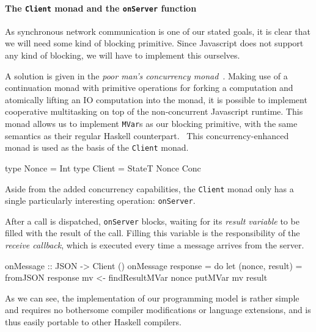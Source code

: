 \documentclass[preprint]{sigplanconf}
\begin{document}
\paragraph{The \lstinline!Client! monad and the \lstinline!onServer! function}
As synchronous network communication is one of our stated goals, it is clear
that we will need some kind of blocking primitive. Since Javascript does not
support any kind of blocking, we will have to implement this ourselves.

A solution is given in the \emph{poor man's concurrency
monad}\ \cite{concurrencymonad}. Making use of a continuation monad with
primitive operations for forking a computation and atomically lifting an IO
computation into the monad, it is possible to implement cooperative
multitasking on top of the non-concurrent Javascript runtime. This monad
allows us to implement \lstinline!MVar!s as our blocking primitive, with the
same semantics as their regular Haskell counterpart.\ \cite{ffi}
This concurrency-enhanced monad is used as the basis of the \lstinline!Client!
monad.

\begin{code}
type Nonce = Int
type Client = StateT Nonce Conc
\end{code}

Aside from the added concurrency capabilities, the \lstinline!Client! monad
only has a single particularly interesting operation: \lstinline!onServer!.


After a call is dispatched, \lstinline!onServer! blocks, waiting for its
\emph{result variable} to be filled with the result of the call. Filling this
variable is the responsibility of the \emph{receive callback}, which is
executed every time a message arrives from the server.

\begin{code}
onMessage :: JSON -> Client ()
onMessage response = do
  let (nonce, result) = fromJSON response
  mv <- findResultMVar nonce
  putMVar mv result
\end{code}

As we can see, the implementation of our programming model is rather simple
and requires no bothersome compiler modifications or language extensions,
and is thus easily portable to other Haskell compilers.
\end{document}
